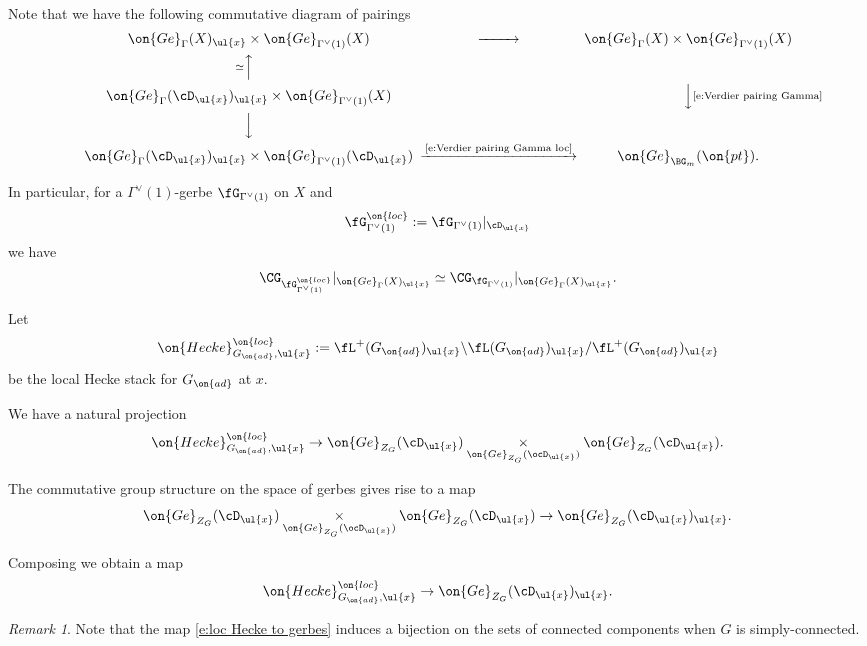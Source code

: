 \documentclass[9pt]{amsart}
\theoremstyle{remark}
\newtheorem{rem}[subsubsection]{Remark}
\theoremstyle{definition}
\theoremstyle{remark}
\numberwithin{equation}{section}
\begin{document}
\sssec{}

Note that we have the following commutative diagram of pairings
\begin{equation} \label{e:loc vs global pairings}
\CD
\on{Ge}_\Gamma(X)_{\ul{x}} \times \on{Ge}_{\Gamma^\vee(1)}(X) @>>> \on{Ge}_\Gamma(X) \times \on{Ge}_{\Gamma^\vee(1)}(X) \\
@A{\simeq}AA  \\
\on{Ge}_\Gamma(\cD_{\ul{x}})_{\ul{x}} \times \on{Ge}_{\Gamma^\vee(1)}(X)  & & @VV{\text{\eqref{e:Verdier pairing Gamma}}}V \\
@VVV \\
\on{Ge}_\Gamma(\cD_{\ul{x}})_{\ul{x}}   \times \on{Ge}_{\Gamma^\vee(1)}(\cD_{\ul{x}})  
@>{\text{\eqref{e:Verdier pairing Gamma loc}}}>> \on{Ge}_{\BG_m}(\on{pt}).
\endCD
\end{equation} 

In particular, for a $\Gamma^\vee(1)$-gerbe $\fG_{\Gamma^\vee(1)}$ on $X$ and
$$\fG^{\on{loc}}_{\Gamma^\vee(1)}:=\fG_{\Gamma^\vee(1)}|_{\cD_{\ul{x}}}$$
we have
$$\CG_{\fG^{\on{loc}}_{\Gamma^\vee(1)}}|_{\on{Ge}_\Gamma(X)_{\ul{x}}}\simeq \CG_{\fG_{\Gamma^\vee(1)}}|_{\on{Ge}_\Gamma(X)_{\ul{x}}}.$$

\sssec{} \label{sss:loc Hecke to gerbes}

Let 
$$\on{Hecke}^{\on{loc}}_{G_{\on{ad}},\ul{x}}:=\fL^+(G_{\on{ad}})_{\ul{x}}\backslash \fL(G_{\on{ad}})_{\ul{x}}/\fL^+(G_{\on{ad}})_{\ul{x}}$$
be the local Hecke stack for $G_{\on{ad}}$ at $x$. 

\medskip

We have a natural projection
$$\on{Hecke}^{\on{loc}}_{G_{\on{ad}},\ul{x}} \to \on{Ge}_{Z_G}(\cD_{\ul{x}})\underset{\on{Ge}_{Z_G}(\ocD_{\ul{x}})}\times \on{Ge}_{Z_G}(\cD_{\ul{x}}).$$

The commutative group structure on the space of gerbes gives rise to a map
$$\on{Ge}_{Z_G}(\cD_{\ul{x}})\underset{\on{Ge}_{Z_G}(\ocD_{\ul{x}})}\times \on{Ge}_{Z_G}(\cD_{\ul{x}})\to 
\on{Ge}_{Z_G}(\cD_{\ul{x}})_{\ul{x}}.$$

Composing we obtain a map
\begin{equation} \label{e:loc Hecke to gerbes}
\on{Hecke}^{\on{loc}}_{G_{\on{ad}},\ul{x}} \to \on{Ge}_{Z_G}(\cD_{\ul{x}})_{\ul{x}}.
\end{equation}

\begin{rem}
Note that the map \eqref{e:loc Hecke to gerbes} induces a bijection on the sets of connected components when $G$
is simply-connected. 
\end{rem} 
\end{document}

